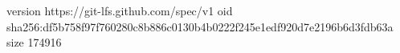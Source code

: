 version https://git-lfs.github.com/spec/v1
oid sha256:df5b758f97f760280c8b886c0130b4b0222f245e1edf920d7e2196b6d3fdb63a
size 174916
